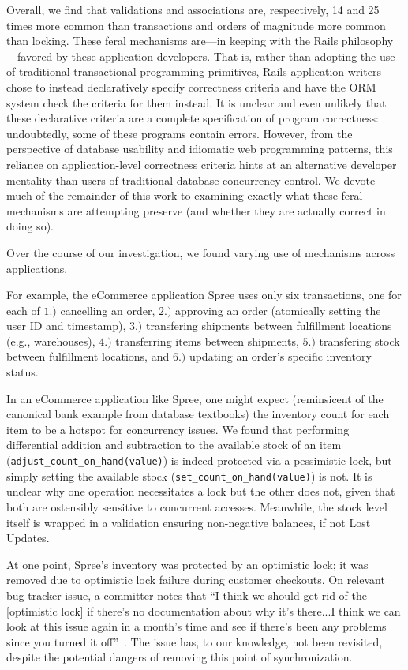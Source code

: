 Overall, we find that validations and associations are, respectively,
14 and 25 times more common than transactions and orders of magnitude
more common than locking. These feral mechanisms are---in keeping with
the Rails philosophy---favored by these application developers. That
is, rather than adopting the use of traditional transactional
programming primitives, Rails application writers chose to instead declaratively specify
correctness criteria and have the ORM system check the criteria for
them instead. It is unclear and even unlikely that these declarative
criteria are a complete specification of program correctness:
undoubtedly, some of these programs contain errors. However, from the
perspective of database usability and idiomatic web programming
patterns, this reliance on application-level correctness criteria
hints at an alternative developer mentality than users of traditional
database concurrency control.  We devote much of the remainder of this
work to examining exactly what these feral mechanisms are attempting
preserve (and whether they are actually correct in doing so).

 Over the course of our
investigation, we found varying use of mechanisms across
applications.

For example, the eCommerce application Spree uses only
six transactions, one for each of $1.)$ cancelling an order, $2.)$
approving an order (atomically setting the user ID and timestamp),
$3.)$ transfering shipments between fulfillment locations (e.g.,
warehouses), $4.)$ transferring items between shipments, $5.)$
transfering stock between fulfillment locations, and $6.)$ updating an
order's specific inventory status.

In an eCommerce application like Spree, one might expect (reminsicent
of the canonical bank example from database textbooks) the inventory
count for each item to be a hotspot for concurrency issues. We found
that performing differential addition and subtraction to the available
stock of an item (\texttt{adjust\_count\_on\_hand(value)}) is indeed
protected via a pessimistic lock, but simply setting the available
stock (\texttt{set\_count\_on\_hand(value)}) is not. It is unclear why
one operation necessitates a lock but the other does not, given that
both are ostensibly sensitive to concurrent accesses. Meanwhile, the
stock level itself is wrapped in a validation ensuring non-negative
balances, if not Lost Updates.

At one point, Spree's inventory was protected by an optimistic lock;
it was removed due to optimistic lock failure during customer
checkouts. On relevant bug tracker issue, a committer notes that ``I
think we should get rid of the [optimistic lock] if there's no
documentation about why it's there...I think we can look at this issue
again in a month's time and see if there's been any problems since you
turned it off''~\cite{code-optimistic-issue}. The issue has, to our
knowledge, not been revisited, despite the potential dangers of
removing this point of synchronization.

